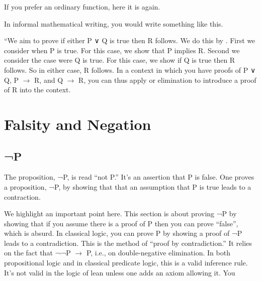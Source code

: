 \documentclass[letterpaper,10pt,english]{sphinxmanual}
\begin{document}
If you prefer an ordinary function, here it is again.

\begin{sphinxVerbatim}[commandchars=\\\{\}]
                   
       
\end{sphinxVerbatim}

In informal mathematical writing, you would write something like this.

“We aim to prove if either P ∨ Q is true then R follows. We do this by
. First we consider when P is true. For this case, we
show that P implies R. Second we consider the case were Q is true. For
this case, we show if Q is true then R follows. So in either case, R
follows. In a context in which you have proofs of P ∨ Q, P \(\rightarrow\) R, and Q
\(\rightarrow\) R, you can thus apply or elimination to introduce a proof of R into
the context.


\section{Falsity and Negation}
\label{\detokenize{15-proofs:falsity-and-negation}}

\subsection{¬P}
\label{\detokenize{15-proofs:p}}
The proposition, ¬P, is read “not P.”  It’s an assertion that P is
false. One proves a proposition, ¬P, by showing that that an
assumption that P is true leads to a contraction.

We highlight an important point here.  This section is about proving
¬P by showing that if you assume there is a proof of P then you can
prove “false”, which is absurd. In classical logic, you can prove P by
showing a proof of ¬P leads to a contradiction. This is the method of
“proof by contradiction.”  It relies on the fact that ¬¬P \(\rightarrow\) P, i.e.,
on double-negative elimination.  In both propositional logic and in
classical predicate logic, this is a valid inference rule. It’s not
valid in the logic of lean unless one adds an axiom allowing it. You
\end{document}
